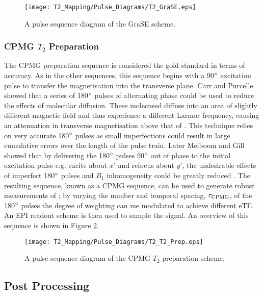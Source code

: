 \begin{figure}[H]
	\centering
	\texttt{[image: T2\_Mapping/Pulse\_Diagrams/T2\_GraSE.eps]}
	\caption{A pulse sequence diagram of the \ac{GraSE} scheme.}
	\label{fig:t2_grase_seq}	
\end{figure}

\newpage
\subsubsection{CPMG $T_2$ Preparation}

The \ac{CPMG} \ttwo preparation sequence is considered the gold standard in terms of accuracy. As in the other sequences, this sequence begins with a 90$\degree$ excitation pulse to transfer the magnetisation into the transverse plane. Carr and Purcelle showed that a series of 180$\degree$ pulses of alternating phase could be used to reduce the effects of molecular diffusion. These molecused diffuse into an area of slightly different magnetic field and thus experience a different Larmor frequency, causing an attenuation in transverse magnetisation above that of \ttwo \cite{carr_effects_1954}. This technique relies on very accurate 180$\degree$ pulses as small imperfections could result in large cumulative errors over the length of the pulse train. Later Meiboom and Gill showed that by delivering the 180$\degree$ pulses 90$\degree$ out of phase to the initial excitation pulse e.g. excite about $x'$ and refocus about $y'$, the undesirable effects of imperfect 180$\degree$ pulses and $B_1$ inhomogeneity could be greatly reduced \cite{meiboom_modified_1958}. The resulting sequence, known as a \acf{CPMG} sequence, can be used to generate robust measurements of \ttwo; by varying the number and temporal spacing, $\tau_{\textup{CPMG}}$, of the 180$\degree$ pulses the degree of \ttwo weighting can me modulated to achieve different \ac{eTE}. An \ac{EPI} readout scheme is then used to sample the signal. An overview of this sequence is shown in Figure \ref{fig:t2_cpmg_t2prep_seq}.

\begin{figure}[H]
	\centering
	\texttt{[image: T2\_Mapping/Pulse\_Diagrams/T2\_T2\_Prep.eps]}
	\caption{A pulse sequence diagram of the \ac{CPMG} $T_2$ preparation scheme.}
	\label{fig:t2_cpmg_t2prep_seq}	
\end{figure}


\subsection{Post Processing}

